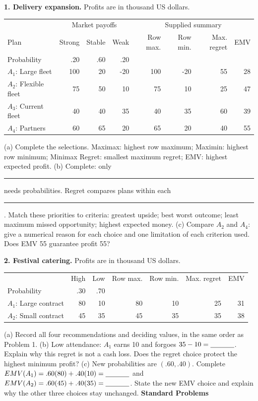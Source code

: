 \textbf{1. Delivery expansion.} Profits are in thousand US dollars.
\begin{center}\begin{tabular}{lrrr|rrrr}\toprule
&\multicolumn{3}{c|}{Market payoffs}&\multicolumn{4}{c}{Supplied summary}\\
Plan & Strong & Stable & Weak & Row max. & Row min. & Max. regret & EMV\\
Probability & .20 & .60 & .20 &&&&\\\midrule
$A_1$: Large fleet &100&20&-20&100&-20&55&28\\
$A_2$: Flexible fleet &75&50&10&75&10&25&47\\
$A_3$: Current fleet &40&40&35&40&35&60&39\\
$A_4$: Partners &60&65&20&65&20&40&55\\\bottomrule
\end{tabular}\end{center}
(a) Complete the selections. Maximax: highest row maximum; Maximin: highest row minimum; Minimax Regret: smallest maximum regret; EMV: highest expected profit.
\choices
(b) Complete: only \rule{25mm}{0.4pt} needs probabilities. Regret compares plans within each \rule{25mm}{0.4pt}. Match these priorities to criteria: greatest upside; best worst outcome; least maximum missed opportunity; highest expected money.
\answerlines
(c) Compare $A_2$ and $A_4$: give a numerical reason for each choice and one limitation of each criterion used. Does EMV 55 guarantee profit 55?
\answerlines

\textbf{2. Festival catering.} Profits are in thousand US dollars.
\begin{center}\begin{tabular}{lrr|rrrr}\toprule
& High & Low & Row max. & Row min. & Max. regret & EMV\\
Probability & .30 & .70 &&&&\\\midrule
$A_1$: Large contract &80&10&80&10&25&31\\
$A_2$: Small contract &45&35&45&35&35&38\\\bottomrule
\end{tabular}\end{center}
(a) Record all four recommendations and deciding values, in the same order as Problem 1.
\answerlines
(b) Low attendance: $A_1$ earns 10 and forgoes $35-10=\underline{\hspace{12mm}}$. Explain why this regret is not a cash loss. Does the regret choice protect the highest minimum profit?
\answerlines
(c) New probabilities are $(.60,.40)$. Complete $EMV(A_1)=.60(80)+.40(10)=\underline{\hspace{12mm}}$ and $EMV(A_2)=.60(45)+.40(35)=\underline{\hspace{12mm}}$. State the new EMV choice and explain why the other three choices stay unchanged.
\answerlines
\newpage
\textbf{Standard Problems}

